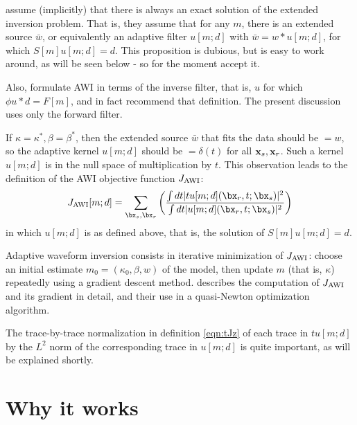 \cite{Warner:16} assume (implicitly) that there is always an exact
solution of the extended inversion problem. That is, they assume that
for any $m$, there is an extended source $\bar{w}$, or equivalently an
adaptive filter $u[m;d]$ with $\bar{w}=w*u[m;d]$, for which
$S[m]u[m;d]= d$. This proposition is dubious, but is easy to work
around, as will be seen below - so for the moment accept it.

Also, \cite{Warner:16} formulate
AWI in terms of the inverse filter, that is, $u$ for which
$\phi u*d = F[m]$, and in fact recommend that definition. The present
discussion uses only the forward filter.

If $\kappa = \kappa^*, \beta = \beta^*$, then the extended source
$\bar{w}$ that fits the data should be $= w$,
so the adaptive kernel $u[m;d]$ should be $=\delta(t)$ for all
${\bf x}_s,{\bf x}_r$. Such a kernel $u[m;d]$ is in the null space of
multiplication by $t$.
This observation leads to the definition of the AWI objective function $J_{\rm AWI}$:
\begin{equation}
  \label{eqn:tJz}
  J_{\rm AWI}[m;d] = \sum_{\bx_s,\bx_r} \left(\frac{\int dt |tu[m;d](\bx_r,t;\bx_s)|^2}{\int dt |u[m;d](\bx_r,t;\bx_s)|^2}\right)
\end{equation}
in which $u[m;d]$ is as defined above, that is, the solution of $S[m]u[m;d]
= d$.

Adaptive waveform inversion consists in iterative minimization of
$J_{\rm AWI}$: choose an initial estimate $m_0=(\kappa_0,\beta, w)$ of the
model, then update $m$ (that is, $\kappa$) repeatedly using a gradient
descent method. \cite{Warner:16} describes the computation of $J_{\rm AWI}$
and its gradient in detail, and their use in a quasi-Newton
optimization algorithm.

The trace-by-trace normalization in definition \ref{eqn:tJz} of each
trace in $tu[m;d]$ by the
$L^2$ norm of the corresponding trace in $u[m;d]$ is quite important, as will be explained shortly.

\section{Why it works}

